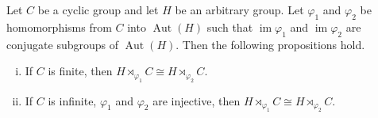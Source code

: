 \begin{proposition} \label{prop-semidirect-useful-tool}
	Let $C$ be a cyclic group and let $H$ be an arbitrary group. Let $\varphi_1$ and $\varphi_2$ be homomorphisms from $C$ into $\operatorname{Aut}(H)$ such that $\operatorname{im} \varphi_1$ and $\operatorname{im}\varphi_2$ are conjugate subgroups of $\operatorname{Aut}(H)$. Then the following propositions hold.
	\begin{enumerate}[(i)]
		\item If $C$ is finite, then $H\rtimes_{\varphi_1} C \cong H\rtimes_{\varphi_2} C$.
		\item If $C$ is infinite,  $\varphi_1$ and $\varphi_2$ are injective, then $H \rtimes_{\varphi_1} C \cong H \rtimes_{\varphi_2} C$.
	\end{enumerate} 
\end{proposition}
